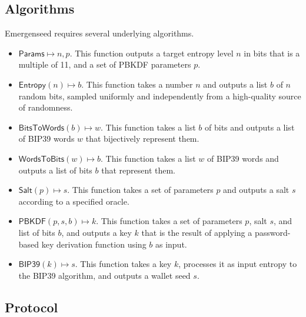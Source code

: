 \documentclass{article}
\begin{document}
\subsection{Algorithms}

Emergenseed requires several underlying algorithms.

\begin{itemize}
	\item $\mathsf{Params} \mapsto n, p$. This function outputs a target entropy level $n$ in bits that is a multiple of 11, and a set of PBKDF parameters $p$.
	\item $\mathsf{Entropy}(n) \mapsto b$. This function takes a number $n$ and outputs a list $b$ of $n$ random bits, sampled uniformly and independently from a high-quality source of randomness.
	\item $\mathsf{BitsToWords}(b) \mapsto w$. This function takes a list $b$ of bits and outputs a list of BIP39 words $w$ that bijectively represent them.
	\item $\mathsf{WordsToBits}(w) \mapsto b$. This function takes a list $w$ of BIP39 words and outputs a list of bits $b$ that represent them.
	\item $\mathsf{Salt}(p) \mapsto s$. This function takes a set of parameters $p$ and outputs a salt $s$ according to a specified oracle.
	\item $\mathsf{PBKDF}(p, s, b) \mapsto k$. This function takes a set of parameters $p$, salt $s$, and list of bits $b$, and outputs a key $k$ that is the result of applying a password-based key derivation function using $b$ as input.
	\item $\mathsf{BIP39}(k) \mapsto s$. This function takes a key $k$, processes it as input entropy to the BIP39 algorithm, and outputs a wallet seed $s$.
\end{itemize}


\subsection{Protocol}
\end{document}
